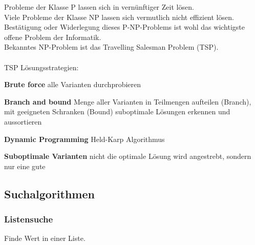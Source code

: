 Probleme der Klasse P lassen sich in vernünftiger Zeit lösen. \\
Viele Probleme der Klasse NP lassen sich vermutlich nicht effizient lösen.\\
Bestätigung oder Widerlegung dieses P-NP-Problems ist wohl das wichtigste offene Problem der Informatik.\\
Bekanntes NP-Problem ist das Travelling Salesman Problem (TSP).\\
\\
TSP Lösungsstrategien:
\begin{compactitem}
    \item \textbf{Brute force} alle Varianten durchprobieren
    \item \textbf{Branch and bound} Menge aller Varianten in Teilmengen aufteilen (Branch), mit geeigneten Schranken (Bound) suboptimale Lösungen erkennen und aussortieren
    \item \textbf{Dynamic Programming} Held-Karp Algorithmus
    \item \textbf{Suboptimale Varianten} nicht die optimale Lösung wird angestrebt, sondern nur eine gute
\end{compactitem}

\subsection{Suchalgorithmen}
\subsubsection{Listensuche}
Finde Wert in einer Liste.\\

